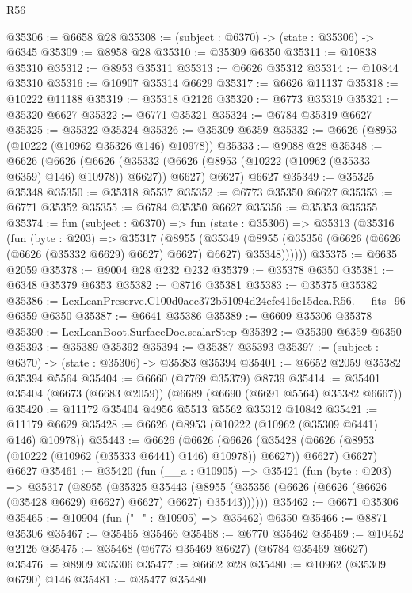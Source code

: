 \begin{lexlean}{R56}
\begin{coremodule}
@35306 := @6658 @28
@35308 := (subject : @6370) -> (state : @35306) -> @6345
@35309 := @8958 @28
@35310 := @35309 @6350
@35311 := @10838 @35310
@35312 := @8953 @35311
@35313 := @6626 @35312
@35314 := @10844 @35310
@35316 := @10907 @35314 @6629
@35317 := @6626 @11137
@35318 := @10222 @11188
@35319 := @35318 @2126
@35320 := @6773 @35319
@35321 := @35320 @6627
@35322 := @6771 @35321
@35324 := @6784 @35319 @6627
@35325 := @35322 @35324
@35326 := @35309 @6359
@35332 := @6626 (@8953 (@10222 (@10962 @35326 @146) @10978))
@35333 := @9088 @28
@35348 := @6626
    (@6626
      (@6626 (@35332 (@6626 (@8953 (@10222 (@10962 (@35333 @6359) @146) @10978)) @6627)) @6627)
      @6627)
    @6627
@35349 := @35325 @35348
@35350 := @35318 @5537
@35352 := @6773 @35350 @6627
@35353 := @6771 @35352
@35355 := @6784 @35350 @6627
@35356 := @35353 @35355
@35374 := fun (subject : @6370) =>
  fun (state : @35306) =>
  @35313
    (@35316
      (fun (byte : @203) =>
      @35317
        (@8955
          (@35349
            (@8955 (@35356 (@6626 (@6626 (@6626 (@35332 @6629) @6627) @6627) @6627) @35348))))))
@35375 := @6635 @2059
@35378 := @9004 @28 @232 @232
@35379 := @35378 @6350
@35381 := @6348 @35379 @6353
@35382 := @8716 @35381
@35383 := @35375 @35382
@35386 := LexLeanPreserve.C100d0aec372b51094d24efe416e15dca.R56.__fits_96 @6359 @6350
@35387 := @6641 @35386
@35389 := @6609 @35306 @35378
@35390 := LexLeanBoot.SurfaceDoc.scalarStep
@35392 := @35390 @6359 @6350
@35393 := @35389 @35392
@35394 := @35387 @35393
@35397 := (subject : @6370) -> (state : @35306) -> @35383 @35394
@35401 := @6652 @2059 @35382 @35394 @5564
@35404 := @6660 (@7769 @35379) @8739
@35414 := @35401 @35404 (@6673 (@6683 @2059)) (@6689 (@6690 (@6691 @5564) @35382 @6667))
@35420 := @11172 @35404 @4956 @5513 @5562 @35312 @10842
@35421 := @11179 @6629
@35428 := @6626 (@8953 (@10222 (@10962 (@35309 @6441) @146) @10978))
@35443 := @6626
    (@6626
      (@6626 (@35428 (@6626 (@8953 (@10222 (@10962 (@35333 @6441) @146) @10978)) @6627)) @6627)
      @6627)
    @6627
@35461 := @35420
    (fun (__a : @10905) =>
    @35421
      (fun (byte : @203) =>
      @35317
        (@8955
          (@35325
            @35443
            (@8955 (@35356 (@6626 (@6626 (@6626 (@35428 @6629) @6627) @6627) @6627) @35443))))))
@35462 := @6671 @35306
@35465 := @10904 (fun ("_" : @10905) => @35462) @6350
@35466 := @8871 @35306
@35467 := @35465 @35466
@35468 := @6770 @35462
@35469 := @10452 @2126
@35475 := @35468 (@6773 @35469 @6627) (@6784 @35469 @6627)
@35476 := @8909 @35306
@35477 := @6662 @28
@35480 := @10962 (@35309 @6790) @146
@35481 := @35477 @35480

\end{coremodule}
\end{lexlean}
